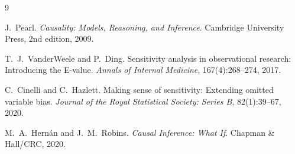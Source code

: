 \documentclass[11pt]{article}
\begin{document}
\begin{thebibliography}{9}

J.~Pearl. \emph{Causality: Models, Reasoning, and Inference}. Cambridge University Press, 2nd edition, 2009.

T.~J.~VanderWeele and P.~Ding. Sensitivity analysis in observational research: Introducing the E-value. \emph{Annals of Internal Medicine}, 167(4):268--274, 2017.

C.~Cinelli and C.~Hazlett. Making sense of sensitivity: Extending omitted variable bias. \emph{Journal of the Royal Statistical Society: Series B}, 82(1):39--67, 2020.

M.~A.~Hern\'an and J.~M.~Robins. \emph{Causal Inference: What If}. Chapman \& Hall/CRC, 2020.

\end{thebibliography}
\end{document}
